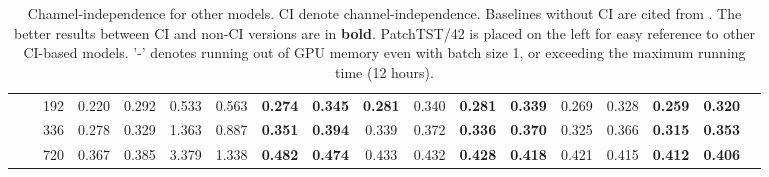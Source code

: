 \documentclass{article} %
\begin{document}
\begin{table}[t]
{\begin{tabular}{cc|c||cc||cc|cc|cc|cc|cc|ccc}
            &\multicolumn{1}{c|}{}& 192   & 0.220  & 0.292  & 0.533  & 0.563  & \textbf{0.274 } & \textbf{0.345 } & \textbf{0.281 } & 0.340  & \textbf{0.281 } & \textbf{0.339 } & 0.269  & 0.328  & \textbf{0.259 } & \textbf{0.320 } \\
            &\multicolumn{1}{c|}{}& 336   & 0.278  & 0.329  & 1.363  & 0.887  & \textbf{0.351 } & \textbf{0.394 } & 0.339  & 0.372  & \textbf{0.336 } & \textbf{0.370 } & 0.325  & 0.366  & \textbf{0.315 } & \textbf{0.353 } \\
            &\multicolumn{1}{c|}{}& 720   & 0.367  & 0.385  & 3.379  & 1.338  & \textbf{0.482 } & \textbf{0.474 } & 0.433  & 0.432  & \textbf{0.428 } & \textbf{0.418 } & 0.421  & 0.415  & \textbf{0.412 } & \textbf{0.406 } \\
			\cline{2-17}
		\end{tabular}
	}
	\caption{Channel-independence for other models. CI denote channel-independence. Baselines without CI are cited from \citet{dlinear}. The better results between CI and non-CI versions are in \textbf{bold}. PatchTST/42 is placed on the left for easy reference to other CI-based models. '-' denotes running out of GPU memory even with batch size 1, or exceeding the maximum running time (12 hours).}
	\label{tab:ciforothers}
\end{table}
\linespread{1}
\end{document}

